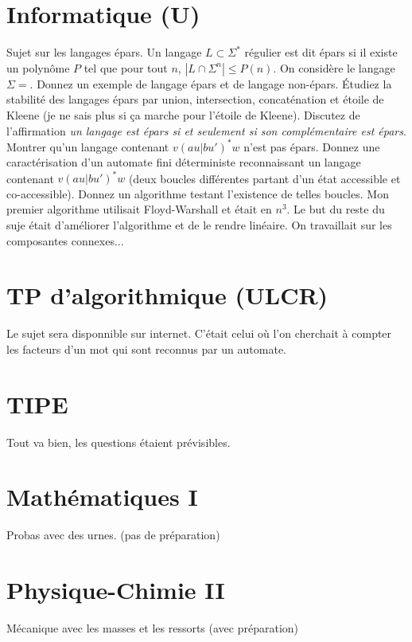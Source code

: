 \documentclass[french,a4paper, 12pt]{article}
\begin{document}
\section*{Informatique (U)}

Sujet sur les langages épars. Un langage $L\subset\Sigma^*$ régulier est dit épars si il existe un polynôme $P$ tel que pour tout $n$, $|L \cap \Sigma^n| \le P(n)$. On considère le langage $\Sigma = {}$. Donnez un exemple de langage épars et de langage non-épars. Étudiez la stabilité des langages épars par union, intersection, concaténation et étoile de Kleene (je ne sais plus si ça marche  pour l'étoile de Kleene). Discutez de l'affirmation \emph{un langage est épars si et seulement si son complémentaire est épars}. Montrer qu'un langage contenant $v(au|bu')^*w$ n'est pas épars. Donnez une caractérisation d'un automate fini déterministe reconnaissant un langage contenant $v(au|bu')^*w$ (deux boucles différentes partant d'un état accessible et co-accessible). Donnez un algorithme testant l'existence de telles boucles. Mon premier algorithme utilisait Floyd-Warshall et était en $n^3$. Le but du reste du suje était d'améliorer l'algorithme et de le rendre linéaire. On travaillait sur les composantes connexes...

\section*{TP d'algorithmique (ULCR)}

Le sujet sera disponnible sur internet. C'était celui où l'on cherchait à compter les facteurs d'un mot qui sont reconnus par un automate.

\section*{}

\section*{TIPE}
Tout va bien, les questions étaient prévisibles.
\section*{Mathématiques I}
Probas avec des urnes. (pas de préparation)
\section*{Physique-Chimie II}
Mécanique avec les masses et les ressorts (avec préparation)
\end{document}
